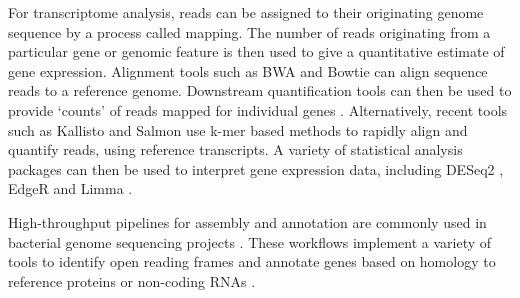 For transcriptome analysis, reads can be assigned to their originating genome sequence by a process called mapping. The number of reads originating from a particular gene or genomic feature is then used to give a quantitative estimate of gene expression. Alignment tools such as BWA \citep{Li2009-cw} and Bowtie \citep{Langmead2012-xq} can align sequence reads to a reference genome. Downstream quantification tools can then be used to provide ‘counts’ of reads mapped for individual genes \citep{Li_Dewey_2011,Anders_Pyl_Huber_2015,Trapnell_Roberts_Goff_Pertea_Kim_Kelley_Pimentel_Salzberg_Rinn_Pachter_2012}. Alternatively, recent tools such as Kallisto \citep{Bray2016-oi} and Salmon \citep{Patro_Duggal_Love_Irizarry_Kingsford_2017} use k-mer based methods to rapidly align and quantify reads, using reference transcripts. A variety of statistical analysis  packages can then be used to interpret gene expression data, including DESeq2 \citep{Love2014-dv}, EdgeR \citep{Robinson_McCarthy_Smyth_2010} and Limma \citep{Ritchie_Phipson_Wu_Hu_Law_Shi_Smyth_2015}.\par
High-throughput pipelines for assembly and annotation are commonly used in bacterial genome sequencing projects \citep{Seemann_2014,Aziz_2008,Tatusova_DiCuccio_Badretdin_Chetvernin_Nawrocki_Zaslavsky_Lomsadze_Pruitt_Borodovsky_Ostell_2016}. These workflows implement a variety of tools to identify open reading frames \citep{Delcher_Bratke_Powers_Salzberg_2007,Hyatt_Chen_Locascio_Land_Larimer_Hauser_2010} and annotate genes based on homology to reference proteins or non-coding RNAs \citep{Punta_2012,Huerta_2017,Altschul1990-kr,Nawrocki_Infernal_2013,Nawrocki_Rfam_2015}.\par

